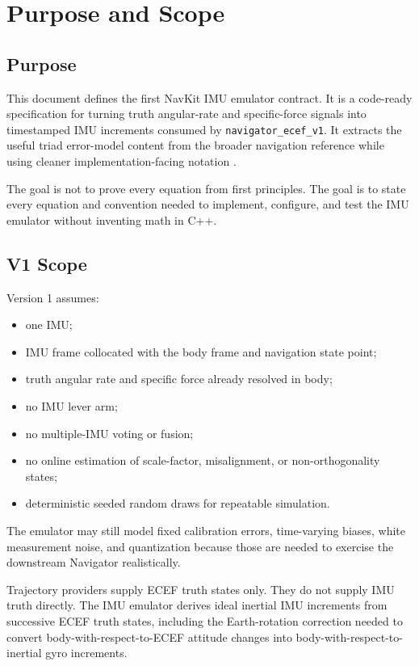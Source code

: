 \chapter{Purpose and Scope}

\section{Purpose}

This document defines the first NavKit IMU emulator contract. It is a
code-ready specification for turning truth angular-rate and specific-force
signals into timestamped IMU increments consumed by
\texttt{navigator\_ecef\_v1}. It extracts the useful triad error-model content
from the broader navigation reference while using cleaner implementation-facing
notation \cite{groves2013,titterton2004,grewal2020}.

\begin{scopebox}
The goal is not to prove every equation from first principles. The goal is to
state every equation and convention needed to implement, configure, and test
the IMU emulator without inventing math in C++.
\end{scopebox}

\section{V1 Scope}

Version 1 assumes:
\begin{itemize}
    \item one IMU;
    \item IMU frame collocated with the body frame and navigation state point;
    \item truth angular rate and specific force already resolved in body;
    \item no IMU lever arm;
    \item no multiple-IMU voting or fusion;
    \item no online estimation of scale-factor, misalignment, or
    non-orthogonality states;
    \item deterministic seeded random draws for repeatable simulation.
\end{itemize}

The emulator may still model fixed calibration errors, time-varying biases,
white measurement noise, and quantization because those are needed to exercise
the downstream Navigator realistically.

\begin{implbox}
Trajectory providers supply ECEF truth states only. They do not supply IMU truth
directly. The IMU emulator derives ideal inertial IMU increments from successive
ECEF truth states, including the Earth-rotation correction needed to convert
body-with-respect-to-ECEF attitude changes into body-with-respect-to-inertial
gyro increments.
\end{implbox}

